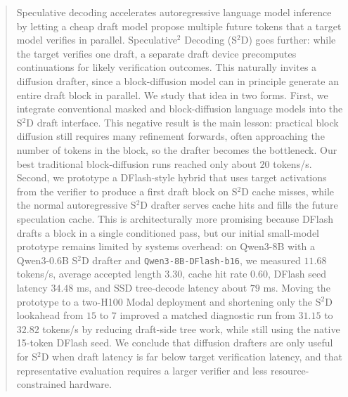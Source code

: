\begin{abstract}
\normalfont
Speculative decoding accelerates autoregressive language model inference by
letting a cheap draft model propose multiple future tokens that a target model
verifies in parallel. Speculative$^2$ Decoding (S$^2$D) goes further: while
the target verifies one draft, a separate draft device precomputes
continuations for likely verification outcomes. This naturally invites a
diffusion drafter, since a block-diffusion model can in principle generate an
entire draft block in parallel. We study that idea in two forms. First, we
integrate conventional masked and block-diffusion language models into the
S$^2$D draft interface. This negative result is the main lesson: practical
block diffusion still requires many refinement forwards, often approaching
the number of tokens in the block, so the drafter becomes the bottleneck. Our
best traditional block-diffusion runs reached only about $20$ tokens/s.
Second, we prototype a DFlash-style hybrid that uses target activations from
the verifier to produce a first draft block on S$^2$D cache misses, while the
normal autoregressive S$^2$D drafter serves cache hits and fills the future
speculation cache. This is architecturally more promising because DFlash
drafts a block in a single conditioned pass, but our initial small-model
prototype remains limited by systems overhead: on Qwen3-8B with a Qwen3-0.6B
S$^2$D drafter and \texttt{Qwen3-8B-DFlash-b16}, we measured $11.68$
tokens/s, average accepted length $3.30$, cache hit rate $0.60$, DFlash seed
latency $34.48$ ms, and SSD tree-decode latency about $79$ ms. Moving the
prototype to a two-H100 Modal deployment and shortening only the S$^2$D
lookahead from $15$ to $7$ improved a matched diagnostic run from $31.15$ to
$32.82$ tokens/s by reducing draft-side tree work, while still using the
native 15-token DFlash seed. We conclude that diffusion drafters are only
useful for S$^2$D when draft latency is far below target verification latency,
and that representative evaluation requires a larger verifier and less
resource-constrained hardware.
\end{abstract}
